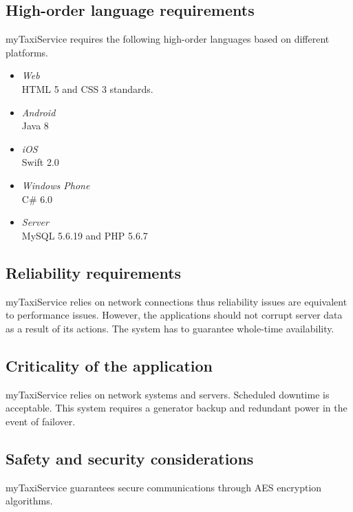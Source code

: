 \subsection{High-order language requirements}
myTaxiService requires the following high-order languages based on different platforms.
\begin{itemize}
	\item\textit{Web}\\
	HTML 5 and CSS 3 standards.
	\item\textit{Android}\\
	Java 8
	\item\textit{iOS}\\
	Swift 2.0
	\item\textit{Windows Phone}\\
	C\# 6.0
	\item \textit{Server}\\
	MySQL 5.6.19 and PHP 5.6.7
\end{itemize}


\subsection{Reliability requirements}
myTaxiService relies on network connections thus reliability issues are equivalent to performance issues.  However, the applications should not corrupt server data as a result of its actions. The system has to guarantee whole-time availability.

\subsection{Criticality of the application}
 myTaxiService relies on network systems and servers. Scheduled downtime is acceptable. This system requires a generator backup and redundant power in the event of failover.

\subsection{Safety and security considerations}
myTaxiService guarantees secure communications through AES encryption algorithms.